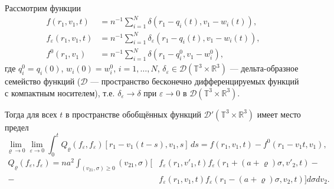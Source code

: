 \begin{theorem}%
Рассмотрим функции
\begin{align}
f(r_1,v_1,t)&=n^{-1}\sum_{i=1}^N\delta(r_1-q_i(t),v_1-w_i(t)),\\
f_\varepsilon(r_1,v_1,t)&=n^{-1}\sum_{i=1}^N\delta_\varepsilon(r_1-q_i(t),v_1-w_i(t)),\\
f^0(r_1,v_1)&=n^{-1}\sum_{i=1}^N\delta(r_1-q_i^0,v_1-w_i^0),
\end{align}
где $q_i^0=q_i(0)$, $w_i(0)=w_i^0$, $i=1,\ldots,N$, $\delta_\varepsilon\in\mathscr D(\mathbb T^3\times\mathbb R^3)$ --- дельта-образное семейство функций ($\mathscr D$ --- пространство бесконечно дифференцируемых функций с компактным носителем), т.е. $\delta_\varepsilon\to\delta$ при $\varepsilon\to0$ в $\mathscr D(\mathbb T^3\times\mathbb R^3)$.

Тогда для всех $t$  в пространстве обобщённых функций $\mathcal D'(\mathbb T^3\times\mathbb R^3)$ имеет место предел
\begin{equation}\label{EqThLim}
\lim_{\varrho\to0}\lim_{\varepsilon\to0}\int_0^t Q_\varrho(f_\varepsilon,f_\varepsilon)[r_1-v_1(t-s),v_1,s]\,ds=f(r_1,v_1,t)- f^0(r_1-v_1t,v_1),
\end{equation}
\begin{equation}\label{EqQBErho}
\begin{split}
Q_\varrho(f_\varepsilon,f_\varepsilon)=na^2\int_{(v_{21},\sigma)\geq0}
(v_{21},\sigma)[&f_\varepsilon(r_1,v'_1,t)f_\varepsilon(r_1+(a+\varrho)\sigma,v'_2,t)-\\-&f_\varepsilon(r_1,v_1,t)f_\varepsilon(r_1-(a+\varrho)\sigma,v_2,t)]
d\sigma dv_2.
\end{split}
\end{equation}

\end{theorem}

\smallskip

